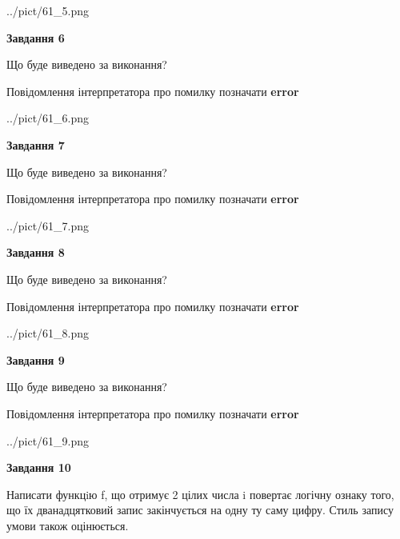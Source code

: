 \documentclass[12pt, ukrainian]{article}
\begin{document}
{\begin {large}
\begin{center}
	{../pict/61_5.png}
\end{center}
\newpage

{\begin {center}\textbf{Завдання 6}\end {center}}\par
Що буде виведено за виконання? \par
Повідомлення інтерпретатора про помилку позначати \textbf{error}

\begin{center}
	{../pict/61_6.png}
\end{center}
\newpage

{\begin {center}\textbf{Завдання 7}\end {center}}\par
Що буде виведено за виконання? \par
Повідомлення інтерпретатора про помилку позначати \textbf{error}

\begin{center}
	{../pict/61_7.png}
\end{center}
\newpage

{\begin {center}\textbf{Завдання 8}\end {center}}\par
Що буде виведено за виконання? \par
Повідомлення інтерпретатора про помилку позначати \textbf{error}

\begin{center}
	{../pict/61_8.png}
\end{center}
\newpage

{\begin {center}\textbf{Завдання 9}\end {center}}\par
Що буде виведено за виконання? \par
Повідомлення інтерпретатора про помилку позначати \textbf{error}

\begin{center}
	{../pict/61_9.png}
\end{center}
\newpage

{\begin {center}\textbf{Завдання 10}\end {center}}\par

Написати функцiю f, що отримує 2 цілих числа i повертає логічну ознаку того, що їх дванадцятковий запис закінчується на одну ту саму цифру. Стиль запису умови також оцінюється.\par
\newpage

\end {large}}
\end{document}
